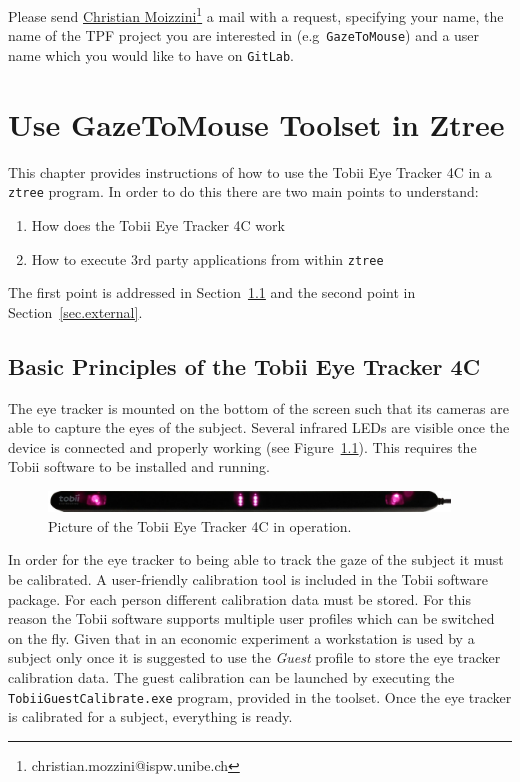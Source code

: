 \documentclass[a4paper,oneside]{book}
\begin{document}
Please send \href{christian.mozzini@ispw.unibe.ch}{Christian Moizzini}\footnote{christian.mozzini@ispw.unibe.ch} a mail with a request, specifying your name, the name of the TPF project you are interested in (e.g~\texttt{GazeToMouse}) and a user name which you would like to have on \texttt{GitLab}.


\chapter{Use GazeToMouse Toolset in Ztree}
\label{sec.gazetomouse}
This chapter provides instructions of how to use the Tobii Eye Tracker 4C in a \texttt{ztree} program.
In order to do this there are two main points to understand:
\begin{enumerate}
    \item How does the Tobii Eye Tracker 4C work
    \item How to execute 3rd party applications from within \texttt{ztree}
\end{enumerate}
The first point is addressed in Section~\ref{sec.eyetracker} and the second point in Section~\ref{sec.external}.

\section{Basic Principles of the Tobii Eye Tracker 4C}
\label{sec.eyetracker}
The eye tracker is mounted on the bottom of the screen such that its cameras are able to capture the eyes of the subject.
Several infrared LEDs are visible once the device is connected and properly working (see Figure~\ref{fig.eyetracker}).
This requires the Tobii software to be installed and running.
\begin{figure}[ht]
    \centering
    \includegraphics[width=0.95\textwidth]{eye_tracker.jpg}
    \caption{Picture of the Tobii Eye Tracker 4C in operation.}
    \label{fig.eyetracker}
\end{figure}

In order for the eye tracker to being able to track the gaze of the subject it must be calibrated.
A user-friendly calibration tool is included in the Tobii software package.
For each person different calibration data must be stored.
For this reason the Tobii software supports multiple user profiles which can be switched on the fly.
Given that in an economic experiment a workstation is used by a subject only once it is suggested to use the \emph{Guest} profile to store the eye tracker calibration data.
The guest calibration can be launched by executing the \texttt{TobiiGuestCalibrate.exe} program, provided in the toolset.
Once the eye tracker is calibrated for a subject, everything is ready.
\end{document}
